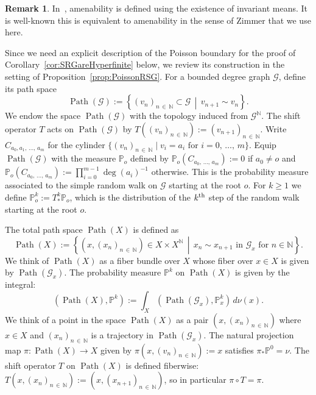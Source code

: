 \documentclass[10pt]{amsart}
\theoremstyle{definition}\newtheorem{defi}[theo]{Definition}\newtheorem{rema}[theo]{Remark}\newtheorem{exam}[theo]{Example}\newtheorem{exem}[theo]{Example}\newtheorem{nota}[theo]{Notation}
\DeclareMathOperator{\Path}{Path}
\newcommand{\bbN}{\mathbb{N}}
\newcommand{\bbP}{\mathbb{P}}
\newcommand{\calG}{\mathcal{G}}
\begin{document}
\begin{rema}
In~\cite{Kai05}, amenability is defined using the existence of invariant means. It is well-known this is equivalent to amenability in the sense of Zimmer that we use here.
\end{rema}

Since we need an explicit description of the Poisson boundary for the proof of Corollary~\ref{cor:SRGareHyperfinite} below, we review its construction in the setting of Proposition~\ref{prop:PoissonRSG}.
For a bounded degree graph $\calG$, define its path space
\[
\Path(\calG):=\left\{(v_n)_{n\,\in\,\bbN}\subset \calG \,\middle|\, v_{n+1}\sim v_n\right\}.
\]
We endow the space $\Path(\calG)$ with the topology induced from $\calG^\bbN$. The shift operator $T$ acts on $\Path(\calG)$ by $T((v_n)_{n\,\in\,\bbN}):=(v_{n+1})_{n\,\in\,\bbN}.$ Write $C_{a_0,a_1,\,\ldots,\,a_m}$ for the cylinder $\{(v_n)_{n\,\in\,\bbN} \mid v_i=a_i \text{ for } i=0,\,\ldots,\,m\}.$
Equip $\Path(\calG)$ with the measure $\bbP_o$ defined by $\bbP_o(C_{a_0,\,\ldots,\,a_m}):=0$ if $a_0\neq o$ and $\bbP_o(C_{a_0,\,\ldots,\,a_m}):=\prod_{i=0}^{m-1} \deg(a_i)^{-1}$ otherwise. This is the probability measure associated to the simple random walk on $\calG$ starting at the root $o$. For $k\geq 1$ we define $\bbP_o^k:=T^k_*\bbP_o$, which is the distribution of the $k^{\rm th}$ step of the random walk starting at the root $o$.

The total path space $\Path(X)$ is defined as
\[
\Path(X):=\left\{(x,(x_n)_{n\,\in\,\bbN})\in X\times X^{\bbN}\,\middle|\, x_n\sim x_{n+1} \text{ in } \calG_x \text { for } n\in \bbN\right\}.
\]
We think of $\Path(X)$ as a fiber bundle over $X$ whose fiber over $x\in X$ is given by $\Path(\calG_x)$. The probability measure $\bbP^k$ on $\Path(X)$ is given by the integral:
\[
\left(\Path(X),\bbP^k\right):=\int_X \left(\Path(\calG_x),\bbP_x^k\right) \, d\nu(x).
\]
We think of a point in the space $\Path(X)$ as a pair $(x, (x_n)_{n\,\in\,\bbN})$ where $x\in X$ and $(x_n)_{n\,\in\,\bbN}$ is a trajectory in $\Path(\calG_x).$ The natural projection map $\pi: \Path(X) \to X$ given by $\pi(x,(v_n)_{n\,\in\,\bbN}):=x$ satisfies $\pi_*\bbP^0=\nu$. The shift operator $T$ on $\Path(X)$ is defined fiberwise: $T(x,(x_n)_{n\,\in\,\bbN}):=(x,(x_{n+1})_{n\,\in\,\bbN})$, so in particular $\pi \circ T=\pi.$
\end{document}
